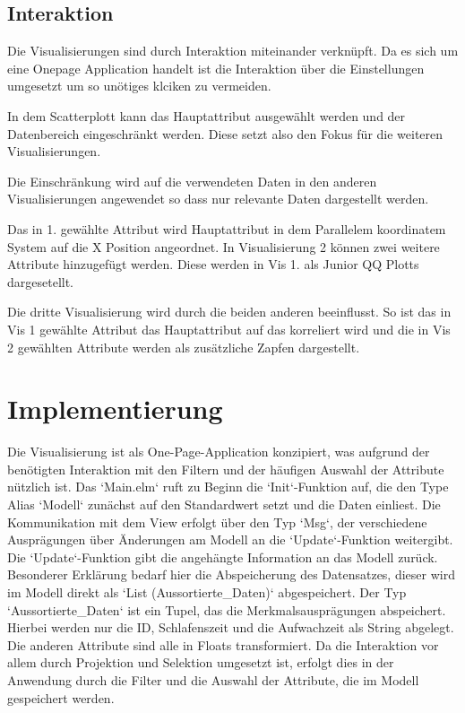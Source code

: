\documentclass[usegeometry=true]{scrartcl}
\begin{document}
\subsection{Interaktion}
Die Visualisierungen sind durch Interaktion miteinander verknüpft. Da es sich um eine Onepage Application handelt ist die 
Interaktion über die Einstellungen umgesetzt um so unötiges klciken zu vermeiden.

In dem Scatterplott kann das Hauptattribut ausgewählt werden und der Datenbereich eingeschränkt werden. 
Diese setzt also den Fokus für die weiteren Visualisierungen.

Die Einschränkung wird auf die verwendeten Daten in den anderen Visualisierungen angewendet so dass nur relevante Daten dargestellt werden.

Das in 1. gewählte Attribut wird  Hauptattribut in dem Parallelem koordinatem System auf die X Position angeordnet.
In Visualisierung 2 können zwei weitere  Attribute hinzugefügt werden. Diese werden in Vis 1. als Junior QQ Plotts dargesetellt.

Die dritte Visualisierung wird durch die beiden anderen beeinflusst. So ist das in Vis 1 gewählte Attribut das Hauptattribut auf das korreliert wird und die in Vis 2 gewählten Attribute werden als zusätzliche Zapfen dargestellt.


\section{Implementierung}

Die Visualisierung ist als One-Page-Application konzipiert, was aufgrund der benötigten Interaktion mit den Filtern und der häufigen Auswahl der Attribute nützlich ist. Das `Main.elm` ruft zu Beginn die `Init`-Funktion auf, die den Type Alias `Modell` zunächst auf den Standardwert setzt und die Daten einliest. Die Kommunikation mit dem View erfolgt über den Typ `Msg`, der verschiedene Ausprägungen über Änderungen am Modell an die `Update`-Funktion weitergibt. Die `Update`-Funktion gibt die angehängte Information an das Modell zurück. Besonderer Erklärung bedarf hier die Abspeicherung des Datensatzes, dieser wird im Modell direkt als `List (Aussortierte\_Daten)` abgespeichert. Der Typ `Aussortierte\_Daten` ist ein Tupel, das die Merkmalsausprägungen abspeichert. Hierbei werden nur die ID, Schlafenszeit und die Aufwachzeit als String abgelegt. Die anderen Attribute sind alle in Floats transformiert. Da die Interaktion vor allem durch Projektion und Selektion umgesetzt ist, erfolgt dies in der Anwendung durch die Filter und die Auswahl der Attribute, die im Modell gespeichert werden.
\end{document}
